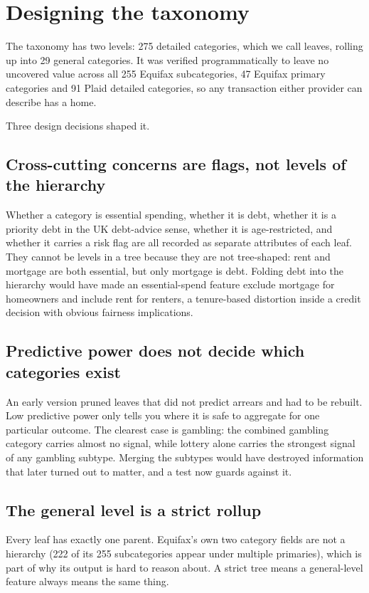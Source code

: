\section{Designing the taxonomy}
The taxonomy has two levels: 275 detailed categories, which we call leaves, rolling up into 29 general categories. It was verified programmatically to leave no uncovered value across all 255 Equifax subcategories, 47 Equifax primary categories and 91 Plaid detailed categories, so any transaction either provider can describe has a home.

Three design decisions shaped it.

\subsection{Cross-cutting concerns are flags, not levels of the hierarchy}
Whether a category is essential spending, whether it is debt, whether it is a priority debt in the UK debt-advice sense, whether it is age-restricted, and whether it carries a risk flag are all recorded as separate attributes of each leaf. They cannot be levels in a tree because they are not tree-shaped: rent and mortgage are both essential, but only mortgage is debt. Folding debt into the hierarchy would have made an essential-spend feature exclude mortgage for homeowners and include rent for renters, a tenure-based distortion inside a credit decision with obvious fairness implications.

\subsection{Predictive power does not decide which categories exist}
An early version pruned leaves that did not predict arrears and had to be rebuilt. Low predictive power only tells you where it is safe to aggregate for one particular outcome. The clearest case is gambling: the combined gambling category carries almost no signal, while lottery alone carries the strongest signal of any gambling subtype. Merging the subtypes would have destroyed information that later turned out to matter, and a test now guards against it.

\subsection{The general level is a strict rollup}
Every leaf has exactly one parent. Equifax's own two category fields are not a hierarchy (222 of its 255 subcategories appear under multiple primaries), which is part of why its output is hard to reason about. A strict tree means a general-level feature always means the same thing.

